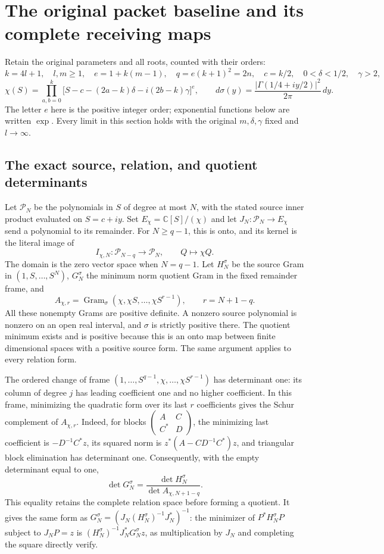 \documentclass[11pt,a4paper]{article}
\newcommand{\C}{\mathbb C}
\begin{document}
\section{The original packet baseline and its complete receiving maps}
\label{sec:BSL}

Retain the original parameters and all roots, counted with their orders:
\[
 k=4l+1,\quad l,m\geq1,\quad e=1+k(m-1),\quad
 q=e(k+1)^2=2n,\quad c=k/2,\quad
 0<\delta<1/2,\quad\gamma>2,
\]
\[
 \chi(S)=\prod_{a,b=0}^{k}
 \bigl[S-c-(2a-k)\delta-i(2b-k)\gamma\bigr]^e,
 \qquad d\sigma(y)=\frac{|\Gamma(1/4+iy/2)|^2}{2\pi}\,dy.
 \tag{BSL1}
\]
The letter $e$ here is the positive integer order; exponential functions
below are written $\exp$. Every limit in this section holds with the
original $m,\delta,\gamma$ fixed and $l\to\infty$.

\subsection{The exact source, relation, and quotient determinants}
Let $\mathcal P_N$ be the polynomials in $S$ of degree at most $N$,
with the stated source inner product evaluated on $S=c+iy$. Set
$E_\chi=\mathbb C[S]/(\chi)$ and let
$J_N:\mathcal P_N\to E_\chi$ send a polynomial to its remainder.
For $N\geq q-1$, this is onto, and its kernel is the literal image of
\[
 I_{\chi,N}:\mathcal P_{N-q}\longrightarrow\mathcal P_N,
 \qquad Q\longmapsto\chi Q.
 \tag{BSL2}
\]
The domain is the zero vector space when $N=q-1$. Let $H_N^\sigma$
be the source Gram in $(1,S,\ldots,S^N)$, $G_N^\sigma$ the minimum
norm quotient Gram in the fixed remainder frame, and
\[
 A_{\chi,r}=\operatorname{Gram}_{\sigma}
       (\chi,\chi S,\ldots,\chi S^{r-1}),\qquad r=N+1-q.
\]
All these nonempty Grams are positive definite. A nonzero source
polynomial is nonzero on an open real interval, and $\sigma$ is
strictly positive there. The quotient minimum exists and is positive
because this is an onto map between finite dimensional spaces with a
positive source form. The same argument applies to every relation form.

The ordered change of frame
$(1,\ldots,S^{q-1},\chi,\ldots,\chi S^{r-1})$ has determinant one:
its column of degree $j$ has leading coefficient one and no higher
coefficient. In this frame, minimizing the quadratic form over its last
$r$ coefficients gives the Schur complement of $A_{\chi,r}$.
Indeed, for blocks $\left(\begin{smallmatrix}A&C\\C^*&D\end{smallmatrix}\right)$,
the minimizing last coefficient is $-D^{-1}C^*z$, its squared norm is
$z^*(A-CD^{-1}C^*)z$, and triangular block elimination has determinant
one. Consequently, with the empty determinant equal to one,
\[
 \det G_N^\sigma=\frac{\det H_N^\sigma}{\det A_{\chi,N+1-q}}.
 \tag{BSL3}
\]
This equality retains the complete relation space before forming a
quotient. It gives the same form as
$G_N^\sigma=(J_N(H_N^\sigma)^{-1}J_N^*)^{-1}$: the minimizer of
$P^*H_N^\sigma P$ subject to $J_NP=z$ is
$(H_N^\sigma)^{-1}J_N^*G_N^\sigma z$, as multiplication by $J_N$
and completing the square directly verify.
\end{document}
